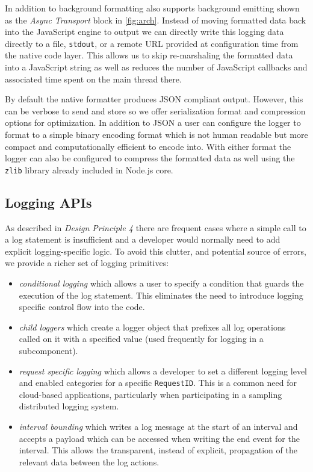 In addition to background formatting \projn also supports background emitting 
shown as the \emph{Async Transport} block in \autoref{fig:arch}. Instead of 
moving formatted data back into the JavaScript engine to output we can directly 
write this logging data directly to a file, \texttt{stdout}, or a remote URL provided at configuration 
time from the native code layer. This 
allows us to skip re-marshaling the formatted data into a JavaScript string as well 
as reduces the number of JavaScript callbacks and associated time spent on the 
main thread there. 

By default the native formatter produces JSON compliant output. However, this 
can be verbose to send and store so we offer serialization format and compression 
options for optimization. In addition to JSON a user can configure the logger 
to format to a simple binary encoding format which is not human readable but 
more compact and computationally efficient to 
encode into. With either format the logger can also be configured to compress the 
formatted data as well using the \texttt{zlib} library already included in 
Node.js core.

\subsection{Logging APIs}
As described in \emph{Design Principle 4} there are frequent cases where a 
simple call to a log statement is insufficient and a developer would normally 
need to add explicit logging-specific logic. To avoid this clutter, and potential 
source of errors, we provide a richer set of logging primitives:
\begin{itemize}
  \item \emph{conditional logging} which allows a user to specify a condition 
  that guards the execution of the log statement. This eliminates the need to 
  introduce logging specific control flow into the code.
  \item \emph{child loggers} which create a logger object that prefixes all log 
  operations called on it with a specified value (used frequently for logging in a 
  subcomponent).
  \item \emph{request specific logging} which allows a developer to set a different 
  logging level and enabled categories for a specific \texttt{RequestID}. This is a 
  common need for cloud-based applications, particularly when participating in a 
  sampling distributed logging system.
  \item \emph{interval bounding} which writes a log message at the start of an interval 
  and accepts a payload which can be accessed when writing the end event for the interval. 
  This allows the transparent, instead of explicit, propagation of the relevant data between 
  the log actions.
\end{itemize}

